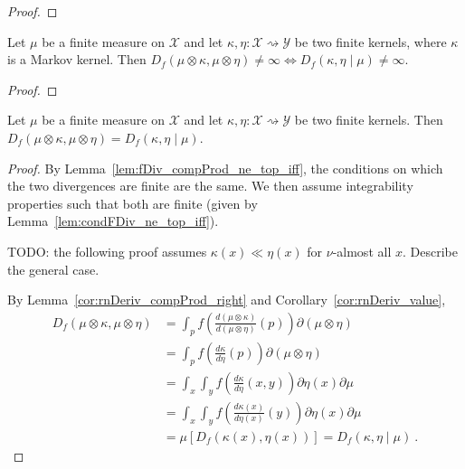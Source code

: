 \begin{proof} \leanok
{}
\end{proof}

\begin{lemma}
  \label{lem:fDiv_compProd_ne_top_iff}
  \leanok
  Let $\mu$ be a finite measure on $\mathcal X$ and let $\kappa, \eta : \mathcal X \rightsquigarrow \mathcal Y$ be two finite kernels, where $\kappa$ is a Markov kernel.
  Then $D_f(\mu \otimes \kappa, \mu \otimes \eta) \ne \infty \iff D_f(\kappa, \eta \mid \mu) \ne \infty$.
\end{lemma}

\begin{proof} \leanok
{}
\end{proof}

\begin{lemma}
  \label{lem:fDiv_compProd_left}
  \leanok
  Let $\mu$ be a finite measure on $\mathcal X$ and let $\kappa, \eta : \mathcal X \rightsquigarrow \mathcal Y$ be two finite kernels.
  Then $D_f(\mu \otimes \kappa, \mu \otimes \eta) = D_f(\kappa, \eta \mid \mu)$.
\end{lemma}

\begin{proof} \leanok
{}
By Lemma~\ref{lem:fDiv_compProd_ne_top_iff}, the conditions on which the two divergences are finite are the same. We then assume integrability properties such that both are finite (given by Lemma~\ref{lem:condFDiv_ne_top_iff}).

TODO: the following proof assumes $\kappa(x) \ll \eta(x)$ for $\nu$-almost all $x$. Describe the general case.

By Lemma~\ref{cor:rnDeriv_compProd_right} and Corollary~\ref{cor:rnDeriv_value},
\begin{align*}
D_f(\mu \otimes \kappa, \mu \otimes \eta)
&= \int_{p} f\left(\frac{d (\mu \otimes \kappa)}{d (\mu \otimes \eta)}(p)\right) \partial(\mu \otimes \eta)
\\
&= \int_{p} f\left(\frac{d \kappa}{d \eta}(p)\right) \partial(\mu \otimes \eta)
\\
&= \int_x \int_y f\left(\frac{d \kappa}{d \eta}(x, y)\right) \partial \eta(x) \partial \mu
\\
&= \int_x \int_y f\left(\frac{d \kappa(x)}{d \eta(x)}(y)\right) \partial \eta(x) \partial \mu
\\
&= \mu\left[D_f(\kappa(x), \eta(x))\right]
= D_f(\kappa, \eta \mid \mu)
\: .
\end{align*}
\end{proof}

